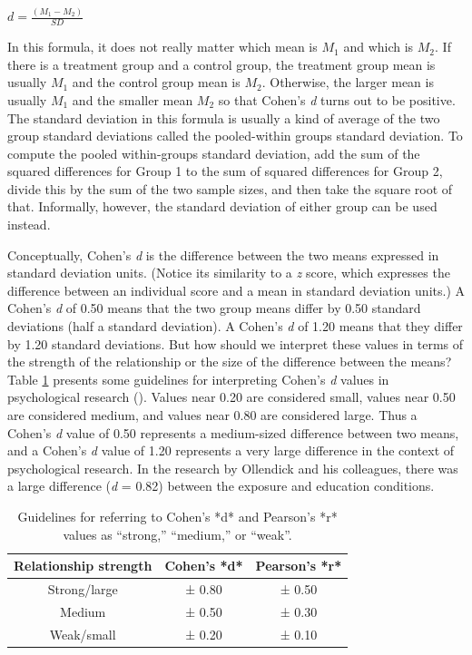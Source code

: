 \documentclass[
]{krantz}
\begin{document}
\(d=\frac{(M_1-M_2)}{SD}\)

In this formula, it does not really matter which mean is \(M_1\) and which is \(M_2\). If there is a treatment group and a control group, the treatment group mean is usually \(M_1\) and the control group mean is \(M_2\). Otherwise, the larger mean is usually \(M_1\) and the smaller mean \(M_2\) so that Cohen's \emph{d} turns out to be positive. The standard deviation in this formula is usually a kind of average of the two group standard deviations called the pooled-within groups standard deviation. To compute the pooled within-groups standard deviation, add the sum of the squared differences for Group 1 to the sum of squared differences for Group 2, divide this by the sum of the two sample sizes, and then take the square root of that. Informally, however, the standard deviation of either group can be used instead.

Conceptually, Cohen's \emph{d} is the difference between the two means expressed in standard deviation units. (Notice its similarity to a \emph{z} score, which expresses the difference between an individual score and a mean in standard deviation units.) A Cohen's \emph{d} of 0.50 means that the two group means differ by 0.50 standard deviations (half a standard deviation). A Cohen's \emph{d} of 1.20 means that they differ by 1.20 standard deviations. But how should we interpret these values in terms of the strength of the relationship or the size of the difference between the means? Table \ref{tab:guidelines} presents some guidelines for interpreting Cohen's \emph{d} values in psychological research (). Values near 0.20 are considered small, values near 0.50 are considered medium, and values near 0.80 are considered large. Thus a Cohen's \emph{d} value of 0.50 represents a medium-sized difference between two means, and a Cohen's \emph{d} value of 1.20 represents a very large difference in the context of psychological research. In the research by Ollendick and his colleagues, there was a large difference (\emph{d} = 0.82) between the exposure and education conditions.

\begin{table}

\caption{\label{tab:guidelines}Guidelines for referring to Cohen’s *d* and Pearson’s *r* values as “strong,” “medium,” or “weak”.}
\centering
\begin{tabular}[t]{c|c|c}
\hline
Relationship strength & Cohen's *d* & Pearson's *r*\\
\hline
Strong/large & ± 0.80 & ± 0.50\\
\hline
Medium & ± 0.50 & ± 0.30\\
\hline
Weak/small & ± 0.20 & ± 0.10\\
\hline
\end{tabular}
\end{table}
\end{document}
